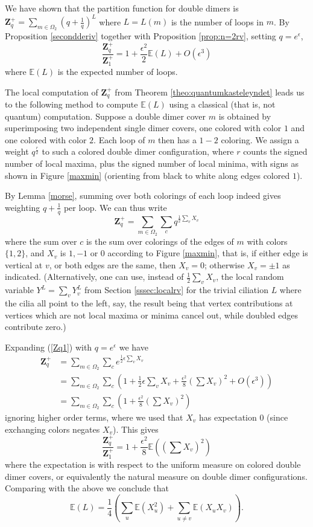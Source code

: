 \documentclass[12pt, reqno]{amsart}
\theoremstyle{definition}
\newcommand{\be}{\begin{equation}}
\newcommand{\ee}{\end{equation}}
\newcommand{\Zq}{\mathbf{Z}_q}%
\newcommand{\E}{\mathbb{E}}%
\begin{document}
We have shown that the partition function for double dimers is  $\Zq^+ = \sum_{m\in\Omega_2}(q+\frac1q)^{L}$ where $L=L(m)$ is the number of loops in $m$. By Proposition \ref{secondderiv} together with Proposition \ref{prop:n=2rv}, setting $q=e^\epsilon$,  
$$
\frac{\Zq^+}{\mathbf{Z}_1^+} =1+\frac{\epsilon^2}2\E(L)+O(\epsilon^3)
$$ 
where $\E(L)$ is the expected number of loops.

The local computation of $\Zq^+$ from Theorem \ref{theo:quantumkasteleyndet} leads us to the following method to  compute $\E(L)$ using a classical (that is, not quantum) computation. Suppose a double dimer cover $m$ is obtained by superimposing two independent single dimer covers, one colored with color $1$ and one colored with color $2$. Each loop of $m$ then has a $1-2$ coloring.   We assign a weight $q^\frac{r}{2}$ to such a colored double dimer configuration, where $r$ counts the signed number of local maxima, plus the signed number of local minima, with signs as shown in Figure \ref{maxmin}  (orienting from black to white along edges colored $1$).

By Lemma \ref{morse}, summing over both colorings of each loop indeed gives weighting $q+\frac{1}{q}$ per loop.    We can thus write 
\be\label{Zq1}
\Zq^+ = \sum_{m\in\Omega_2}\sum_c q^{\frac12\sum_vX_v}
\ee
where the sum over $c$ is the sum over colorings of the edges of $m$ with colors $\{1,2\}$, and $X_v$ is $1,-1$ or $0$ according to Figure \ref{maxmin}, that is, if either edge is vertical at $v$, or both edges are the same,  then $X_v=0$; otherwise $X_v=\pm1$ as indicated.  (Alternatively, one can use, instead of $\frac12\sum_vX_v$, the local random variable $Y^L=\sum_v Y^L_v$ from Section \ref{sssec:localrv} for the trivial ciliation $L$ where the cilia all point to the left, say, the result being that vertex contributions at vertices which are not local maxima or minima cancel out, while doubled edges contribute zero.)

Expanding (\ref{Zq1}) with $q=e^\epsilon$ we have
\begin{align*}
\Zq^+ &= \sum_{m\in\Omega_2}\sum_c e^{\frac12\epsilon\sum_v X_v}\\
&=\sum_{m\in\Omega_2}\sum_c \left(1+\frac12\epsilon\sum_v X_v+\frac{\epsilon^2}8\left(\sum X_v\right)^2+O(\epsilon^3)\right)\\
&=\sum_{m\in\Omega_2}\sum_c \left(1+\frac{\epsilon^2}8\left(\sum X_v\right)^2\right)
\end{align*}
ignoring higher order terms, where we used that $X_v$ has expectation $0$ (since exchanging colors negates $X_v$). This gives
$$
\frac{\Zq^+}{\mathbf{Z}_1^+}=1+\frac{\epsilon^2}8\E\left(\left(\sum X_v\right)^2\right)
$$
where the expectation is with respect to the uniform measure on colored double dimer covers, or equivalently the  natural measure on double dimer configurations.    Comparing with the above we conclude that 
$$
\E(L) = \frac14\left(\sum_u\E(X_u^2)+\sum_{u\ne v}\E(X_uX_v)\right).
$$
\end{document}

